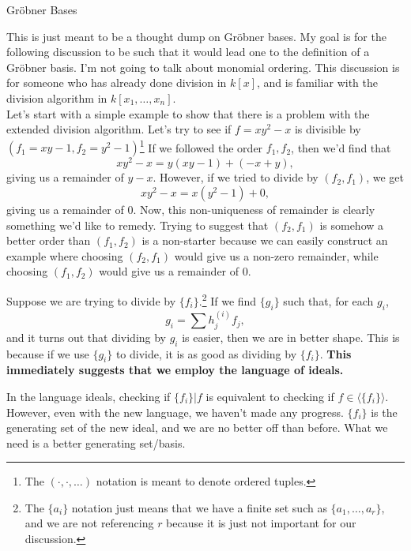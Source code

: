 \documentclass[10pt]{article}
\newcommand{\gb}{Gr\"{o}bner }
\newcommand*{\ideal}[1]{\langle#1\rangle}
\begin{document}
\begin{center}\sc\Large
\gb Bases
\end{center}

This is just meant to be a thought dump on \gb bases. My goal is for the following discussion to be such that it would lead one to the definition of a \gb basis. I'm not going to talk about monomial ordering. This discussion is for someone who has already done division in $k[x]$, and is familiar with the division algorithm in $k[x_1, \ldots, x_n]$. \\

Let's start with a simple example to show that there is a problem with the extended division algorithm. Let's try to see if $f = xy^2 - x$ is divisible by $(f_1 = xy - 1, f_2 = y^2 - 1)$\footnote{The $(\cdot, \cdot, \ldots)$ notation is meant to denote ordered tuples.} If we followed the order $f_1, f_2$, then we'd find that
\[
xy^2 - x = y(xy-1) + (-x + y),
\]
giving us a remainder of $y-x$. However, if we tried to divide by $(f_2, f_1)$, we get
\[
xy^2 - x = x(y^2-1) + 0,
\]
giving us a remainder of 0. Now, this non-uniqueness of remainder is clearly something we'd like to remedy. Trying to suggest that $(f_2, f_1)$ is somehow a better order than $(f_1, f_2)$ is a non-starter because we can easily construct an example where choosing $(f_2, f_1)$ would give us a non-zero remainder, while choosing $(f_1, f_2)$ would give us a remainder of 0. \\

\begin{ideabox}
Suppose we are trying to divide by $\{f_i\}$.\footnote{The $\{a_i\}$ notation just means that we have a finite set such as $\{a_1, \ldots, a_r\}$, and we are not referencing $r$ because it is just not important for our discussion.} If we find $\{g_i\}$  such that, for each $g_i$,
\[
g_i = \sum h^{(i)}_jf_j,
\]
and it turns out that dividing by $g_i$ is easier, then we are in better shape. This is because if we use $\{g_i\}$ to divide, it is as good as dividing by $\{f_i\}$. \textbf{This immediately suggests that we employ the language of ideals.}
\end{ideabox}

In the language ideals, checking if $\{f_i\} | f$ is equivalent to checking if $f \in \ideal{\{f_i\}}$. However, even with the new language, we haven't made any progress. $\{f_i\}$ is the generating set of the new ideal, and we are no better off than before. What we need is a better generating set/basis. \\
\end{document}
